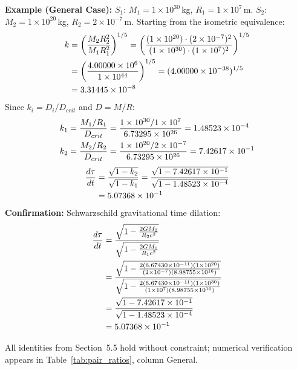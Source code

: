 \documentclass[twoside,twocolumn,9pt]{article}
\begin{document}
\begin{mdframed}
\textbf{Example (General Case):} $S_1$: $M_1 = 1 \times 10^{30}$\,kg, $R_1 = 1 \times 10^{7}$\,m. $S_2$: $M_2 = 1 \times 10^{20}$\,kg, $R_2 = 2 \times 10^{-7}$\,m. Starting from the isometric equivalence:
\begin{align}
k &= \left(\frac{M_2 R_2^2}{M_1 R_1^2}\right)^{1/5}
= \left(\frac{(1 \times 10^{20}) \cdot (2 \times 10^{-7})^2}{(1 \times 10^{30}) \cdot (1 \times 10^{7})^2}\right)^{1/5} \notag \\
&= \left(\frac{4.00000 \times 10^{6}}{1 \times 10^{44}}\right)^{1/5}
= (4.00000 \times 10^{-38})^{1/5} \notag \\
&= 3.31445 \times 10^{-8} \notag
\end{align}
Since $k_i = D_i/D_{crit}$ and $D = M/R$:
\begin{align}
k_1 &= \frac{M_1/R_1}{D_{crit}}
= \frac{1 \times 10^{30}/1 \times 10^{7}}{6.73295 \times 10^{26}}
= 1.48523 \times 10^{-4} \notag \\
k_2 &= \frac{M_2/R_2}{D_{crit}}
= \frac{1 \times 10^{20}/2 \times 10^{-7}}{6.73295 \times 10^{26}}
= 7.42617 \times 10^{-1} \notag
\end{align}
\begin{align}
\frac{d\tau}{dt} &= \frac{\sqrt{1 - k_2}}{\sqrt{1 - k_1}}
= \frac{\sqrt{1 - 7.42617 \times 10^{-1}}}{\sqrt{1 - 1.48523 \times 10^{-4}}} \notag \\
&= 5.07368 \times 10^{-1} \notag
\end{align}
\textbf{Confirmation:} Schwarzschild gravitational time dilation:
\begin{align}
\frac{d\tau}{dt} &= \frac{\sqrt{1 - \frac{2GM_2}{R_2 c^2}}}{\sqrt{1 - \frac{2GM_1}{R_1 c^2}}} \notag \\
&= \frac{\sqrt{1 - \frac{2(6.67430 \times 10^{-11})(1 \times 10^{20})}{(2 \times 10^{-7})(8.98755 \times 10^{16})}}}{\sqrt{1 - \frac{2(6.67430 \times 10^{-11})(1 \times 10^{30})}{(1 \times 10^{7})(8.98755 \times 10^{16})}}} \notag \\
&= \frac{\sqrt{1 - 7.42617 \times 10^{-1}}}{\sqrt{1 - 1.48523 \times 10^{-4}}} \notag \\
&= 5.07368 \times 10^{-1} \notag
\end{align}
\end{mdframed}

\noindent All identities from Section~5.5 hold without constraint; numerical verification appears in Table~\ref{tab:pair_ratios}, column General.
\end{document}
